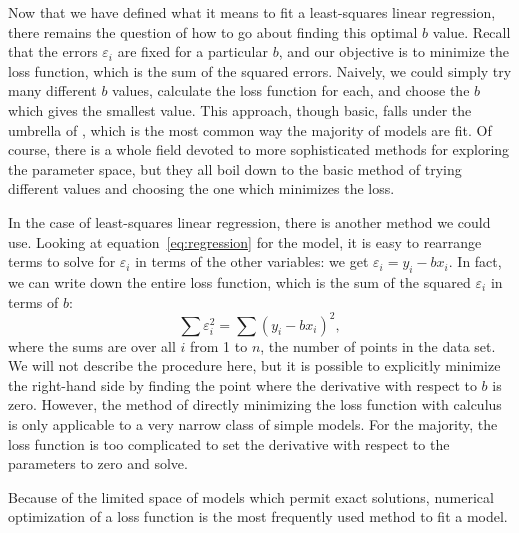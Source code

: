 
Now that we have defined what it means to fit a least-squares linear
regression, there remains the question of how to go about finding this optimal
$b$ value. Recall that the errors $\varepsilon_i$ are fixed for a particular
$b$, and our objective is to minimize the loss function, which is the sum of
the squared errors. Naively, we could simply try many different $b$ values,
calculate the loss function for each, and choose the $b$ which gives the
smallest value. This approach, though basic, falls under the umbrella of
, which is the most common way the majority of
models are fit. Of course, there is a whole field devoted to more sophisticated
methods for exploring the parameter space, but they all boil down to the basic
method of trying different values and choosing the one which minimizes the
loss.

In the case of least-squares linear regression, there is another method we
could use. Looking at equation~\ref{eq:regression} for the model, it is easy to
rearrange terms to solve for $\varepsilon_i$ in terms of the other variables:
we get $\varepsilon_i = y_i - bx_i$. In fact, we can write down the entire loss
function, which is the sum of the squared $\varepsilon_i$ in terms of $b$:
\[
  \sum \varepsilon_i^2 = \sum (y_i - bx_i)^2,
\]
where the sums are over all $i$ from 1 to $n$, the number of points in the data
set. We will not describe the procedure here, but it is possible to explicitly
minimize the right-hand side by finding the point where the derivative with
respect to $b$ is zero. However, the method of directly minimizing the loss
function with calculus is only applicable to a very narrow class of simple
models. For the majority, the loss function is too complicated to set the
derivative with respect to the parameters to zero and solve.

Because of the limited space of models which permit exact solutions, numerical
optimization of a loss function is the most frequently used method to fit a
model. 

